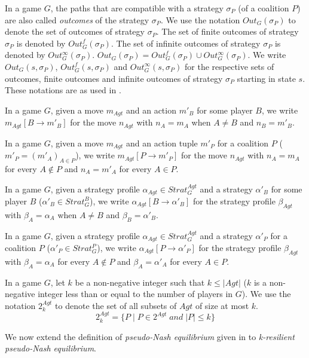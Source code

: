 In a game $G$, the paths that are compatible with a strategy $\sigma_{P}$ (of a coalition $P$) are also called \textit{outcomes} of the strategy $\sigma_{P}$. We use the notation $Out_{G}(\sigma_{P})$ to denote the set of outcomes of strategy $\sigma_{P}$. The set of finite outcomes of strategy $\sigma_{P}$ is denoted by $Out_{G}^{f}(\sigma_{P})$. The set of infinite outcomes of strategy $\sigma_{P}$ is denoted by $Out_{G}^{\infty}(\sigma_{P})$. $Out_{G}(\sigma_{P}) = Out_{G}^{f}(\sigma_{P}) \cup Out_{G}^{\infty}(\sigma_{P})$. We write $Out_{G}(s, \sigma_{P})$, $Out_{G}^{f}(s, \sigma_{P})$ and $Out_{G}^{\infty}(s, \sigma_{P})$ for the respective sets of outcomes, finite outcomes and infinite outcomes of strategy $\sigma_{P}$ starting in state $s$. These notations are as used in \cite{BBM-concur10,BBM-report}.

In a game $G$, given a move $m_{Agt}$ and an action $m'_{B}$ for some player $B$, we write $m_{Agt}[B \rightarrow m'_{B}]$ for the move $n_{Agt}$ with $n_{A} = m_{A}$ when $A \neq B$ and $n_{B} = m'_{B}$.

In a game $G$, given a move $m_{Agt}$ and an action tuple $m'_{P}$ for a coalition $P$ ($m'_{P} = (m'_{A})_{A\in P}$), we write $m_{Agt}[P \rightarrow m'_{P}]$ for the move $n_{Agt}$ with $n_{A} = m_{A}$ for every $A \notin P$ and $n_{A} = m'_{A}$ for every $A \in P$.

In a game $G$, given a strategy profile $\alpha_{Agt} \in Strat^{Agt}_{G}$ and a strategy $\alpha'_{B}$ for some player $B$ ($\alpha'_{B} \in Strat^{B}_{G}$), we write $\alpha_{Agt}[B \rightarrow \alpha'_{B}]$ for the strategy profile $\beta_{Agt}$ with $\beta_{A} = \alpha_{A}$ when $A \neq B$ and $\beta_{B} = \alpha'_{B}$.

In a game $G$, given a strategy profile $\alpha_{Agt} \in Strat^{Agt}_{G}$ and a strategy $\alpha'_{P}$ for a coalition $P$ ($\alpha'_{P} \in Strat^{P}_{G}$), we write $\alpha_{Agt}[P \rightarrow \alpha'_{P}]$ for the strategy profile $\beta_{Agt}$ with $\beta_{A} = \alpha_{A}$ for every $A \notin P$ and $\beta_{A} = \alpha'_{A}$ for every $A \in P$.

In a game $G$, let $k$ be a non-negative integer such that $k \leq \vert Agt \vert$ ($k$ is a non-negative integer less than or equal to the number of players in $G$). We use the notation $2^{Agt}_{k}$ to denote the set of all subsets of $Agt$ of size at most $k$.
\[2^{Agt}_{k} = \lbrace P \; \vert \; P \in 2^{Agt} \; and \; \vert P \vert \leq k \rbrace\] 

We now extend the definition of \textit{pseudo-Nash equilibrium} given in \cite{BBM-concur10,BBM-report} to \textit{k-resilient pseudo-Nash equilibrium}.

